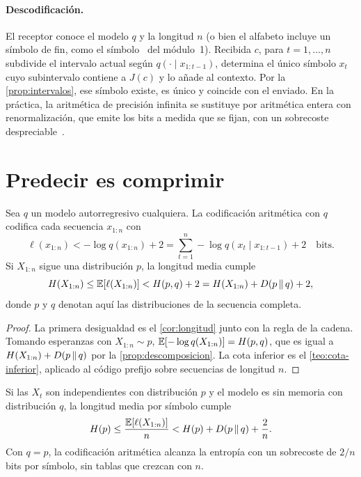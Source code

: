 \paragraph{Descodificación.} El receptor conoce el modelo $q$ y la longitud $n$ (o bien el alfabeto incluye un símbolo de fin, como el símbolo \fin\ del módulo~1). Recibida $c$, para $t=1,\dots,n$ subdivide el intervalo actual según $q(\cdot\mid x_{1:t-1})$, determina el único símbolo $x_t$ cuyo subintervalo contiene a $J(c)$ y lo añade al contexto. Por la \cref{prop:intervalos}, ese símbolo existe, es único y coincide con el enviado. En la práctica, la aritmética de precisión infinita se sustituye por aritmética entera con renormalización, que emite los bits a medida que se fijan, con un sobrecoste despreciable~\cite{wnc}.

\section{Predecir es comprimir}

\begin{teorema}\label{teo:compresion}
Sea $q$ un modelo autorregresivo cualquiera. La codificación aritmética con $q$ codifica cada secuencia $x_{1:n}$ con
\[
\ell(x_{1:n})<-\log q(x_{1:n})+2=\sum_{t=1}^{n}-\log q(x_t\mid x_{1:t-1})+2\quad\text{bits}.
\]
Si $X_{1:n}$ sigue una distribución $p$, la longitud media cumple
\[
H(X_{1:n})\le\mathbb{E}[\ell(X_{1:n})]<H(p,q)+2=H(X_{1:n})+D(p\,\|\,q)+2,
\]
donde $p$ y $q$ denotan aquí las distribuciones de la secuencia completa.
\end{teorema}

\begin{proof}
La primera desigualdad es el \cref{cor:longitud} junto con la regla de la cadena. Tomando esperanzas con $X_{1:n}\sim p$, $\mathbb{E}[-\log q(X_{1:n})]=H(p,q)$, que es igual a $H(X_{1:n})+D(p\,\|\,q)$ por la \cref{prop:descomposicion}. La cota inferior es el \cref{teo:cota-inferior}, aplicado al código prefijo sobre secuencias de longitud $n$.
\end{proof}

\begin{corolario}\label{cor:por-simbolo}
Si las $X_t$ son independientes con distribución $p$ y el modelo es sin memoria con distribución $q$, la longitud media por símbolo cumple
\[
H(p)\le\frac{\mathbb{E}[\ell(X_{1:n})]}{n}<H(p)+D(p\,\|\,q)+\frac{2}{n}.
\]
Con $q=p$, la codificación aritmética alcanza la entropía con un sobrecoste de $2/n$ bits por símbolo, sin tablas que crezcan con $n$.
\end{corolario}

